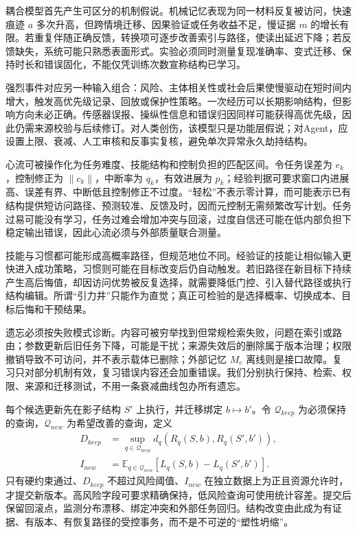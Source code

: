 耦合模型首先产生可区分的机制假说。机械记忆表现为同一材料反复被访问，快速痕迹 $a$ 多次升高，但跨情境迁移、因果验证或任务收益不足，慢证据 $m$ 的增长有限。若重复伴随正确反馈，转换项可逐步改善索引与路径，使读出延迟下降；若反馈缺失，系统可能只熟悉表面形式。实验必须同时测量复现准确率、变式迁移、保持时长和错误固化，不能仅凭训练次数宣称结构已学习。

强烈事件对应另一种输入组合：风险、主体相关性或社会后果使慢驱动在短时间内增大，触发高优先级记录、回放或保护性策略。一次经历可以长期影响结构，但影响方向未必正确。传感器误报、操纵性信息和错误归因同样可能获得高优先级，因此仍需来源校验与后续修订。对人类创伤，该模型只是功能层假说；对Agent，应设置上限、衰减、人工审核和反事实复核，避免单次异常永久劫持结构。

心流可被操作化为任务难度、技能结构和控制负担的匹配区间。令任务误差为 $e_k$，控制修正为 $\|c_k\|$，中断率为 $q_k$，有效进展为 $p_k$；经验判据可要求窗口内进展高、误差有界、中断低且控制修正不过度。“轻松”不表示零计算，而可能表示已有结构提供短访问路径、预测较准、反馈及时，因而元控制无需频繁改写计划。任务过易可能没有学习，任务过难会增加冲突与回滚，过度自信还可能在低内部负担下稳定输出错误，因此心流必须与外部质量联合测量。

技能与习惯都可能形成高概率路径，但规范地位不同。经验证的技能让相似输入更快进入成功策略，习惯则可能在目标改变后仍自动触发。若旧路径在新目标下持续产生高后悔值，却因访问优势被反复选择，就需要降低门控、引入替代路径或执行结构编辑。所谓“引力井”只能作为直觉；真正可检验的是选择概率、切换成本、目标后悔和干预结果。

遗忘必须按失败模式诊断。内容可被穷举找到但常规检索失败，问题在索引或路由；参数更新后旧任务下降，可能是干扰；来源失效后的删除属于版本治理；权限撤销导致不可访问，并不表示载体已删除；外部记忆 $M_e$ 离线则是接口故障。复习只对部分机制有效，复习错误内容还会加重错误。我们分别执行保持、检索、权限、来源和迁移测试，不用一条衰减曲线包办所有遗忘。

每个候选更新先在影子结构 $S'$ 上执行，并迁移绑定 $b\mapsto b'$。令 $\mathcal Q_{keep}$ 为必须保持的查询，$\mathcal Q_{new}$ 为希望改善的查询，定义
\begin{align}
 D_{keep}&=\sup_{q\in\mathcal Q_{keep}}d_q(R_q(S,b),R_q(S',b')),\\
 I_{new}&=\mathbb E_{q\in\mathcal Q_{new}}[L_q(S,b)-L_q(S',b')].
\end{align}
只有硬约束通过、$D_{keep}$ 不超过风险阈值、$I_{new}$ 在独立数据上为正且资源允许时，才提交新版本。高风险字段可要求精确保持，低风险查询可使用统计容差。提交后保留回滚点，监测分布漂移、绑定冲突和外部任务回归。结构改变由此成为有证据、有版本、有恢复路径的受控事务，而不是不可逆的“塑性坍缩”。

